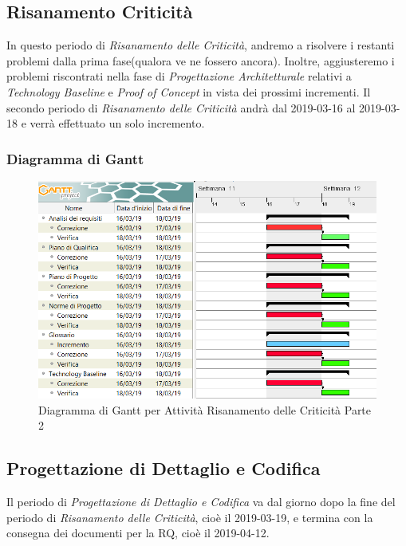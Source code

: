 \subsection{Risanamento Criticità}
\label{RC2}
In questo periodo di \textit{Risanamento delle Criticità}, andremo a risolvere i restanti problemi dalla prima fase(qualora ve ne fossero ancora). Inoltre, aggiusteremo i problemi riscontrati nella fase di \textit{Progettazione Architetturale} relativi a \textit{Technology Baseline} e \textit{Proof of Concept} in vista dei prossimi incrementi.
Il secondo periodo di \textit{Risanamento delle Criticità} andrà dal 2019-03-16 al 2019-03-18 e verrà effettuato un solo incremento.

\subsubsection{Diagramma di Gantt}

\begin{figure}[h]
	\centering
  		\includegraphics[width=1.0\linewidth]{./images/RisanamentoCriticita2.png}
  		\caption{Diagramma di Gantt per Attività Risanamento delle Criticità Parte 2}
  		\label{fig:Gantt Risananmento Criticità 2}
\end{figure}

\newpage
\subsection{Progettazione di Dettaglio e Codifica}
\label{PDC}
Il periodo di \textit{Progettazione di Dettaglio e Codifica} va dal giorno dopo la fine del periodo di \textit{Risanamento delle Criticità}, cioè il 2019-03-19, e termina con la consegna dei documenti per la RQ, cioè il 2019-04-12.\\

